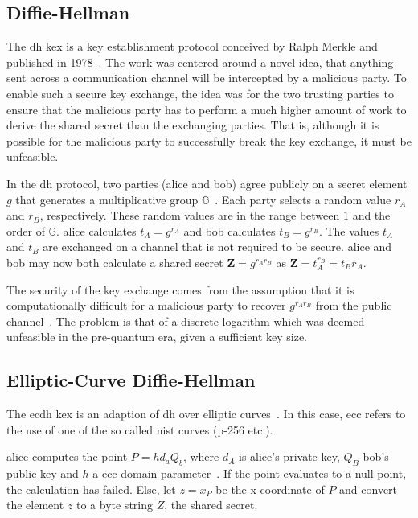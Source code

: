 \subsection{Diffie-Hellman}
\label{section:background:diffie-hellman}

The \gls{dh} \gls{kex} is a key establishment protocol conceived by Ralph Merkle and published in 1978~\cite{merkle1978}. The work was centered around a novel idea, that anything sent across a communication channel will be intercepted by a malicious party. To enable such a secure key exchange, the idea was for the two trusting parties to ensure that the malicious party has to perform a much higher amount of work to derive the shared secret than the exchanging parties. That is, although it is possible for the malicious party to successfully break the key exchange, it must be unfeasible.

In the \gls{dh} protocol, two parties (\gls{alice} and \gls{bob}) agree publicly on a secret element $g$ that generates a multiplicative group $\mathbb{G}$~\cite{merkle1978, boyd2020}. Each party selects a random value $r_A$ and $r_B$, respectively. These random values are in the range between $1$ and the order of $\mathbb{G}$. \gls{alice} calculates $t_A=g^{r_A}$ and \gls{bob} calculates $t_B=g^{r_B}$. The values $t_A$ and $t_B$ are exchanged on a channel that is not required to be secure. \gls{alice} and \gls{bob} may now both calculate a shared secret $\mathbf{Z}=g^{r_A r_B}$ as $\mathbf{Z}=t_A^{r_B}=t_B{r_A}$.

The security of the key exchange comes from the assumption that it is computationally difficult for a malicious party to recover $g^{r_A r_B}$ from the public channel~\cite{boyd2020}. The problem is that of a discrete logarithm which was deemed unfeasible in the pre-quantum era, given a sufficient key size.

\subsection{Elliptic-Curve Diffie-Hellman}

The \gls{ecdh} \gls{kex} is an adaption of \gls{dh} over elliptic curves~\cite{nist2018}. In this case, \gls{ecc} refers to the use of one of the so called \gls{nist} curves (\gls{p-256} etc.).

\gls{alice} computes the point $P=hd_aQ_b$, where $d_A$ is \gls{alice}'s private key, $Q_B$ \gls{bob}'s public key and $h$ a \gls{ecc} domain parameter~\cite{nist2018}. If the point evaluates to a null point, the calculation has failed. Else, let $z=x_P$ be the x-coordinate of $P$ and convert the element $z$ to a byte string $Z$, the shared secret.

